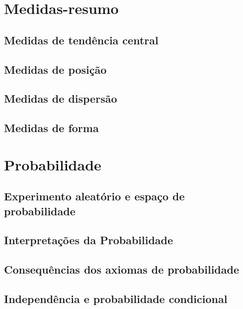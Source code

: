 \documentclass[
  letterpaper,
]{book}
\theoremstyle{plain}
\theoremstyle{definition}
\theoremstyle{remark}
\begin{document}
\part{Medidas-resumo}

\chapter{Medidas de tendência
central}\label{medidas-de-tenduxeancia-central}

\chapter{Medidas de posição}\label{medidas-de-posiuxe7uxe3o}

\chapter{Medidas de dispersão}\label{medidas-de-dispersuxe3o}

\chapter{Medidas de forma}\label{medidas-de-forma}

\part{Probabilidade}

\chapter{Experimento aleatório e espaço de
probabilidade}\label{experimento-aleatuxf3rio-e-espauxe7o-de-probabilidade}

\chapter{Interpretações da
Probabilidade}\label{interpretauxe7uxf5es-da-probabilidade}

\chapter{Consequências dos axiomas de
probabilidade}\label{consequuxeancias-dos-axiomas-de-probabilidade}

\chapter{Independência e probabilidade
condicional}\label{independuxeancia-e-probabilidade-condicional}
\end{document}
